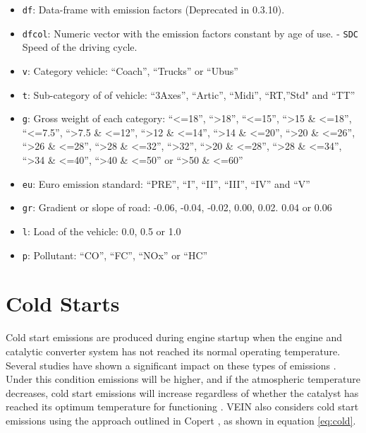 \documentclass[12pt,graybox,envcountchap,sectrefs]{krantz}
\providecommand{\tightlist}{%
  \setlength{\itemsep}{0pt}\setlength{\parskip}{0pt}}
\theoremstyle{definition}
\theoremstyle{definition}
\theoremstyle{definition}
\theoremstyle{remark}
\begin{document}
\begin{itemize}
\tightlist
\item
  \texttt{df}: Data-frame with emission factors (Deprecated in 0.3.10).
\item
  \texttt{dfcol}: Numeric vector with the emission factors constant by
  age of use. - \texttt{SDC} Speed of the driving cycle.
\item
  \texttt{v}: Category vehicle: ``Coach'', ``Trucks'' or ``Ubus''
\item
  \texttt{t}: Sub-category of of vehicle: ``3Axes'', ``Artic'',
  ``Midi'', ``RT,''Std" and ``TT''
\item
  \texttt{g}: Gross weight of each category: ``\textless{}=18'',
  ``\textgreater{}18'', ``\textless{}=15'', ``\textgreater{}15 \&
  \textless{}=18'', ``\textless{}=7.5'', ``\textgreater{}7.5 \&
  \textless{}=12'', ``\textgreater{}12 \& \textless{}=14'',
  ``\textgreater{}14 \& \textless{}=20'', ``\textgreater{}20 \&
  \textless{}=26'', ``\textgreater{}26 \& \textless{}=28'',
  ``\textgreater{}28 \& \textless{}=32'', ``\textgreater{}32'',
  ``\textgreater{}20 \& \textless{}=28'', ``\textgreater{}28 \&
  \textless{}=34'', ``\textgreater{}34 \& \textless{}=40'',
  ``\textgreater{}40 \& \textless{}=50'' or ``\textgreater{}50 \&
  \textless{}=60''
\item
  \texttt{eu}: Euro emission standard: ``PRE'', ``I'', ``II'', ``III'',
  ``IV'' and ``V''
\item
  \texttt{gr}: Gradient or slope of road: -0.06, -0.04, -0.02, 0.00,
  0.02. 0.04 or 0.06
\item
  \texttt{l}: Load of the vehicle: 0.0, 0.5 or 1.0
\item
  \texttt{p}: Pollutant: ``CO'', ``FC'', ``NOx'' or ``HC''
\end{itemize}

\section{Cold Starts}\label{cold-starts}

Cold start emissions are produced during engine startup when the engine
and catalytic converter system has not reached its normal operating
temperature. Several studies have shown a significant impact on these
types of emissions \citep[\citet{Weilenmannetal2009}]{chenetal2011}.
Under this condition emissions will be higher, and if the atmospheric
temperature decreases, cold start emissions will increase regardless of
whether the catalyst has reached its optimum temperature for functioning
\citep{artemis}. VEIN also considers cold start emissions using the
approach outlined in Copert \citep{NtziachristosSamaras2016}, as shown
in equation \eqref{eq:cold}.
\end{document}
